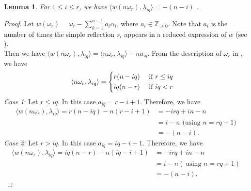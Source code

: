 \documentclass[12pt,reqno]{amsart}
\numberwithin{equation}{section}
\newtheorem{lemma}[theorem]{Lemma}
\theoremstyle{definition}
\begin{document}
 	 \begin{lemma} \label{Lemma 4.1}
 	For $1\leq i\leq r$,
 	we have $\langle w(n\omega_{r}),\lambda_{iq}\rangle=-(n-i)$ .
 \end{lemma}
 \begin{proof}
 	Let $w(\omega_{r})=\omega_{r}-\sum_{k=1}^{n-1}a_{i}\alpha_{i}$, where $a_{i}\in\mathbb{Z}_{\geq 0}$. Note that $a_{i}$ is the number of times the simple reflection $s_{i}$ appears in a reduced expression of $w$ (see \cite[Corollary 1.4]{sskannan}). \\
 	Then we have $\langle w(n\omega_{r}),\lambda_{iq}\rangle=\langle n\omega_{r},\lambda_{iq}\rangle-na_{iq}$.
 	From the description of $\omega_{r}$ in \cite[p.69]{Hum1}, we have
 	\begin{align*}
 		\langle n\omega_{r},\lambda_{iq}\rangle&=\begin{dcases}
 		r(n-iq)&\text{\ if $r\leq iq$}\\
 		iq(n-r)&\text{\ if $iq<r$}
 		\end{dcases}
 	\end{align*}
 	{\it Case 1}: Let $r\leq iq$. In this case $a_{iq}=r-i+1$. Therefore, we have
 	\begin{align*}
 		\langle w(n\omega_{r}),\lambda_{iq}\rangle=r(n-iq)-n(r-i+1)
 		&=-irq+in-n\\
 		&=i-n\text{\ (using $n=rq+1$)}\\
 		&=-(n-i).
 	\end{align*}
 	{\it Case 2}: Let $r>iq$. In this case $a_{iq}=iq-i+1$. Therefore, we have
 	\begin{align*}
 		\langle w(n\omega_{r}),\lambda_{iq}\rangle=iq(n-r)-n(iq-i+1)
 		&=-irq+in-n\\
 		&=i-n(\ \text{using $n=rq+1$})\\
 		&=-(n-i).
 	\end{align*}
 \end{proof}
\end{document}
